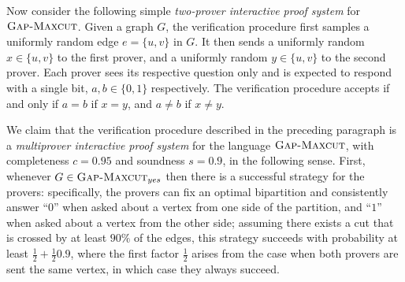 \documentclass[11pt]{article}
\theoremstyle{definition}
\newcommand{\GX}{\textsc{Gap-Maxcut}}
\newcommand{\class}[1]{\ensuremath{\mathsf{#1}}\xspace}
\newcommand{\NP}{\class{NP}} %
\newcommand{\IP}{\class{IP}} %
\newcommand{\MIP}{\class{MIP}} %
\newcommand{\tnote}[1]{}
\newcommand{\hnote}[1]{}
\begin{document}
Now consider the following simple \emph{two-prover interactive proof system} for $\GX$. Given a graph $G$, the verification procedure first samples a uniformly random edge $e=\{u,v\}$ in $G$. It then sends a uniformly random $x\in\{u,v\}$ to the first prover, and a uniformly random $y\in \{u,v\}$ to the second prover. Each prover sees its respective question only and is expected to respond with a single bit, $a,b\in\{0,1\}$ respectively. The verification procedure accepts if and only if $a=b$ if $x=y$, and $a\neq b$ if $x\neq y$.

We claim that the verification procedure described in the preceding paragraph is a \emph{multiprover interactive proof system} for the language $\GX$, with completeness $c=0.95$ and soundness $s=0.9$, in the following sense. First, whenever $G\in \GX_{yes}$ then there is a successful strategy for the provers: specifically, the provers can fix an optimal bipartition and consistently answer ``$0$'' when asked about a vertex from one side of the partition, and ``$1$'' when asked about a vertex from the other side; assuming there exists a cut that is crossed by at least $90\%$ of the edges, this strategy succeeds with probability at least $\frac{1}{2} + \frac{1}{2}0.9$, where the first factor $\frac{1}{2}$ arises from the case when both provers are sent the same vertex, in which case they always succeed. 
\end{document}
